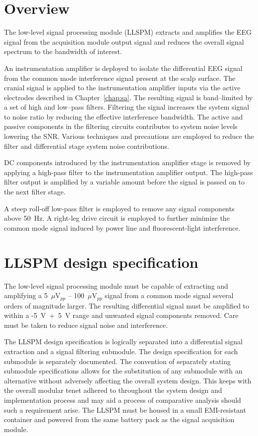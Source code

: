 
\section{Overview}
The low-level signal processing module (LLSPM) extracts and amplifies
the EEG signal from the acquisition module output signal and reduces
the overall signal spectrum to the bandwidth of interest.

An instrumentation amplifier is deployed to isolate the differential
EEG signal from the common mode interference signal present at the
scalp surface. The cranial signal is applied to the instrumentation
amplifier inputs via the active electrodes described in
Chapter~\ref{chap:sa}. The resulting signal is band--limited by a set
of high and low--pass filters. Filtering the signal increases the
system signal to noise ratio by reducing the effective interference
bandwidth. The active and passive components in the filtering circuits
contributes to system noise levels lowering the SNR. Various
techniques and precautions are employed to reduce the filter and
differential stage system noise contributions.

DC components introduced by the instrumentation amplifier stage is
removed by applying a high-pass filter to the instrumentation
amplifier output. The high-pass filter output is amplified by a
variable amount before the signal is passed on to the next filter
stage.

A steep roll-off low-pass filter is employed to remove any signal
components above 50~Hz. A right-leg drive circuit is employed to
further minimize the common mode signal induced by power line and
fluorescent-light interference.


\section{LLSPM design specification}
The low-level signal processing module must be capable of extracting
and amplifying a 5~$\mu$V$_{pp}$ -- 100~$\mu$V$_{pp}$ signal from a
common mode signal several orders of magnitude larger. The resulting
differential signal must be amplified to within a -5~V~+~5~V range and
unwanted signal components removed. Care must be taken to reduce
signal noise and interference.

The LLSPM design specification is logically separated into a
differential signal extraction and a signal filtering submodule. The
design specification for each submodule is separately documented. The
convention of separately stating submodule specifications allows for
the substitution of any submodule with an alternative without adversely
affecting the overall system design. This keeps with the overall
modular tenet adhered to throughout the system design and
implementation process and may aid a process of comparative analysis
should such a requirement arise. The LLSPM must be housed in a small
EMI-resistant container and powered from the same battery pack as the
signal acquisition module.

